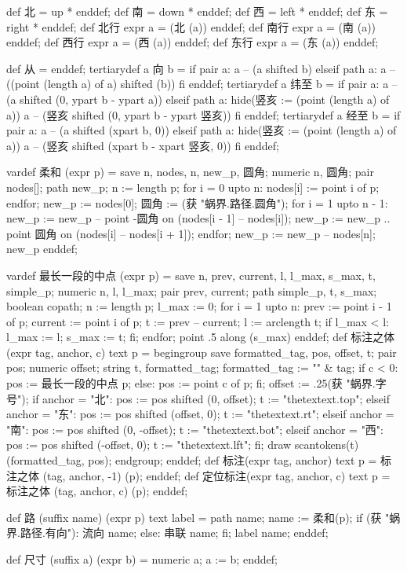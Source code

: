 \startMPinclusions[+]
def 北 = up * enddef; def 南 = down * enddef;
def 西 = left * enddef; def 东 = right * enddef;
def 北行 expr a = (北 (a)) enddef;
def 南行 expr a = (南 (a)) enddef;
def 西行 expr a = (西 (a)) enddef;
def 东行 expr a = (东 (a)) enddef;

def 从 = enddef;
tertiarydef a 向 b =
  if pair a:
    a -- (a shifted b)
  elseif path a:
    a -- ((point (length a) of a) shifted (b))
  fi
enddef;
tertiarydef a 纬至 b = 
  if pair a:
    a -- (a shifted (0, ypart b - ypart a))
  elseif path a:
    hide(竖亥 := (point (length a) of a))
    a -- (竖亥 shifted (0, ypart b - ypart 竖亥))
  fi
enddef;
tertiarydef a 经至 b = 
  if pair a:
    a -- (a shifted (xpart b, 0))
  elseif path a:
    hide(竖亥 := (point (length a) of a))
    a -- (竖亥 shifted (xpart b - xpart 竖亥, 0))
  fi
enddef;
\stopMPinclusions

\startMPinclusions[+]
vardef 柔和 (expr p) =
  save n, nodes, n, new_p, 圆角; 
  numeric n, 圆角; pair nodes[]; path new_p;
  n := length p;
  for i = 0 upto n:
    nodes[i] := point i of p;
  endfor;
  new_p := nodes[0];
  圆角 := (获 "蜗界.路径.圆角");
  for i = 1 upto n - 1:
    new_p := new_p -- point -圆角 on (nodes[i - 1] -- nodes[i]);
    new_p := new_p .. point 圆角 on (nodes[i] -- nodes[i + 1]);
  endfor;
  new_p := new_p -- nodes[n];
  new_p
enddef;
\stopMPinclusions

\startMPinclusions[+]
vardef 最长一段的中点 (expr p) =
  save n, prev, current, l, l_max, s_max, t, simple_p;
  numeric n, l, l_max;
  pair prev, current; 
  path simple_p, t, s_max;
  boolean copath;
  n := length p;
  l_max := 0;
  for i = 1 upto n:
    prev := point i - 1 of p;
    current := point i of p;
    t := prev -- current;
    l := arclength t;
    if l_max < l:
      l_max := l;
      s_max := t;
    fi;
  endfor;
  point .5 along (s_max)
enddef;
def 标注之体 (expr tag, anchor, c) text p =
  begingroup
    save formatted_tag, pos, offset, t;
    pair pos; numeric offset; string t, formatted_tag;
    formatted_tag := "\tfx" & tag;
    if c < 0:
      pos := 最长一段的中点 p;
    else:
      pos := point c of p;
    fi;
    offset := .25(获 "蜗界.字号");
    if anchor = "北":
      pos := pos shifted (0, offset);
      t := "thetextext.top";
    elseif anchor = "东":
      pos := pos shifted (offset, 0);
      t := "thetextext.rt";
    elseif anchor = "南":
      pos := pos shifted (0, -offset);
      t := "thetextext.bot";
    elseif anchor = "西":
      pos := pos shifted (-offset, 0);
      t := "thetextext.lft";
    fi;
    draw scantokens(t)(formatted_tag, pos);
  endgroup;
enddef;
def 标注(expr tag, anchor) text p =
  标注之体 (tag, anchor, -1) (p);
enddef;
def 定位标注(expr tag, anchor, c) text p =
  标注之体 (tag, anchor, c) (p);
enddef;
\stopMPinclusions

\startMPinclusions[+]
def 路 (suffix name) (expr p) text label =
  path name; name := 柔和(p);
  if (获 "蜗界.路径.有向"):
    流向 name;
  else:
    串联 name;
  fi;
  label name;
enddef;
\stopMPinclusions

\startMPinclusions[+]
def 尺寸 (suffix a) (expr b) =
  numeric a;
  a := b;
enddef;
\stopMPinclusions
